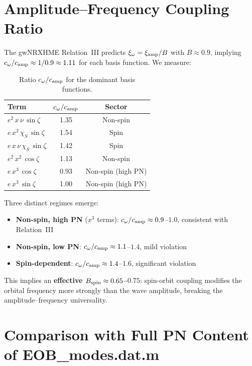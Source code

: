 \documentclass[11pt,letterpaper]{article}
\newcommand{\xamp}{\xi_{\rm amp}}
\newcommand{\xomg}{\xi_{\omega}}
\newcommand{\chiS}{\chi_S}
\begin{document}
\section{Amplitude--Frequency Coupling Ratio}
\label{sec:ratio}

The gwNRXHME Relation~III predicts $\xomg = \xamp / B$ with $B \approx 0.9$, implying $c_\omega / c_{\rm amp} \approx 1/0.9 \approx 1.11$ for each basis function. We measure:

\begin{table}[H]
\centering
\caption{Ratio $c_\omega/c_{\rm amp}$ for the dominant basis functions.}
\label{tab:ratio}
\begin{tabular}{@{}lcc@{}}
\toprule
Term & $c_\omega / c_{\rm amp}$ & Sector \\
\midrule
$e^2\, x\, \nu\, \sin\zeta$ & 1.35 & Non-spin \\
$e\, x^2\, \chiS\, \sin\zeta$ & 1.54 & Spin \\
$e\, x\, \nu\, \chiS\, \sin\zeta$ & 1.42 & Spin \\
$e^2\, x^2\, \cos\zeta$ & 1.13 & Non-spin \\
$e\, x^3\, \cos\zeta$ & 0.93 & Non-spin (high PN) \\
$e\, x^3\, \sin\zeta$ & 1.00 & Non-spin (high PN) \\
\bottomrule
\end{tabular}
\end{table}

\noindent Three distinct regimes emerge:
\begin{itemize}[nosep]
\item \textbf{Non-spin, high PN} ($x^3$ terms): $c_\omega/c_{\rm amp} \approx 0.9$--$1.0$, consistent with Relation~III
\item \textbf{Non-spin, low PN}: $c_\omega/c_{\rm amp} \approx 1.1$--$1.4$, mild violation
\item \textbf{Spin-dependent}: $c_\omega/c_{\rm amp} \approx 1.4$--$1.6$, significant violation
\end{itemize}
This implies an \textbf{effective $B_{\rm spin} \approx 0.65$--$0.75$}: spin-orbit coupling modifies the orbital frequency more strongly than the wave amplitude, breaking the amplitude--frequency universality.

\section{Comparison with Full PN Content of EOB\_modes.dat.m}
\label{sec:pn_compare}
\end{document}
